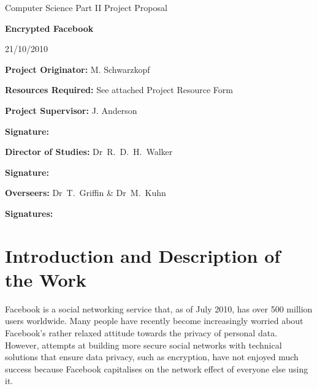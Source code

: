 \documentclass[12pt]{article}
\begin{document}
\thispagestyle{empty}

\medskip
{}
\medskip
{}

\vfil

\centerline{\large Computer Science Part II Project Proposal}
\vspace{0.4in}
\centerline{\Large\bf Encrypted Facebook}
\vspace{0.3in}
\centerline{\large 21/10/2010}

\vfil

{\bf Project Originator:} M. Schwarzkopf

\vspace{0.1in}

{\bf Resources Required:} See attached Project Resource Form

\vspace{0.5in}

{\bf Project Supervisor:} J. Anderson

\vspace{0.2in}

{\bf Signature:}

\vspace{0.5in}

{\bf Director of Studies:} Dr~R.~D.~H.~Walker

\vspace{0.2in}

{\bf Signature:}

\vspace{0.5in}

{\bf Overseers:} Dr~T.~Griffin  \& Dr~M.~Kuhn

\vspace{0.2in}

{\bf Signatures:}

\vfil
\eject

\section*{Introduction and Description of the Work}

Facebook is a social networking service that, as of July 2010, has over 500 million users worldwide. Many people have recently become increasingly worried about Facebook's rather relaxed attitude towards the privacy of personal data. However, attempts at building more secure social networks with technical solutions that ensure data privacy, such as encryption, have not enjoyed much success because Facebook capitalises on the network effect of everyone else using it.
\end{document}

